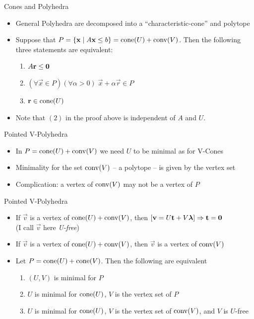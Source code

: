 \documentclass{beamer}
\begin{document}
\begin{frame}{Cones and Polyhedra}
\begin{itemize}
  \item General Polyhedra are decomposed into a ``characteristic-cone'' and polytope
  \item Suppose that $P = \left\{\mathbf{x}\;|\; A\mathbf{x}\leq b\right\} = \operatorname{cone}(U) + \operatorname{conv}(V)$.  Then the following three statements are equivalent:
    \begin{enumerate}
      \item $A\mathbf{r}\leq\mathbf{0}$
      \item $(\forall \vec{x}\in P)(\forall \alpha > 0)\;\vec{x} + \alpha\vec{r} \in P$
      \item $\mathbf{r} \in \operatorname{cone}(U)$
    \end{enumerate}
  \item Note that $(2)$ in the proof above is independent of $A$ and $U$.
\end{itemize}
\end{frame}

\begin{frame}{Pointed V-Polyhedra}
\begin{itemize}
  \item In $P = \operatorname{cone}(U)+\operatorname{conv}(V)$ we need $U$ to be minimal as for V-Cones
  \item Minimality for the set $\operatorname{conv}(V)$ -- a polytope -- is given by the vertex set
  \item Complication: a vertex of $\operatorname{conv}(V)$ may not be a vertex of $P$
\end{itemize}
\end{frame}

\begin{frame}{Pointed V-Polyhedra}
\begin{itemize}
	\item If $\vec{v}$ is a vertex of $\operatorname{cone}(U) + \operatorname{conv}(V)$, then $[\mathbf{v} = U\mathbf{t} + V\bm{\lambda}] \Rightarrow \mathbf{t} = \mathbf{0}$  \\
  (I call $\vec{v}$ here \textit{U-free})
  \item If $\vec{v}$ is a vertex of $\operatorname{cone}(U) + \operatorname{conv}(V)$, then $\vec{v}$ is a vertex of $\operatorname{conv}(V)$
	\item Let $P = \operatorname{cone}(U)+ \operatorname{cone}(V)$.  Then the following are equivalent
    \begin{enumerate}
      \item $(U,V)$ is minimal for $P$
      \item $U$ is minimal for $\operatorname{cone}(U)$, $V$ is the vertex set of $P$
      \item $U$ is minimal for $\operatorname{cone}(U)$, $V$ is the vertex set of $\operatorname{conv}(V)$, and $V$ is $U$-free
    \end{enumerate}

\end{itemize}
\end{frame}
\end{document}
